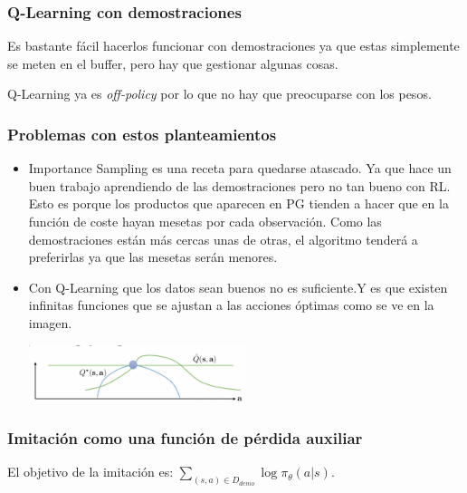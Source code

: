 \subsubsection{Q-Learning con demostraciones}%
\label{ssub:q_learning_con_demostraciones}

Es bastante fácil hacerlos funcionar con demostraciones ya que estas simplemente se meten en
el buffer, pero hay que gestionar algunas cosas.

Q-Learning ya es \textit{off-policy} por lo que no hay que preocuparse con los pesos.

\subsubsection{Problemas con estos planteamientos}%
\label{ssub:problemas_con_estos_planteamientos}

\begin{itemize}
    \item Importance Sampling es una receta para quedarse atascado. Ya que hace un buen trabajo
        aprendiendo de las demostraciones pero no tan bueno con RL. Esto es porque los productos
        que aparecen en PG tienden a hacer que en la función de coste hayan mesetas por cada
        observación. Como las demostraciones están más cercas unas de otras, el algoritmo
        tenderá a preferirlas ya que las mesetas serán menores.
    \item Con Q-Learning que los datos sean buenos no es suficiente.Y es que existen infinitas
     funciones que se ajustan a las acciones óptimas como se ve en la imagen.
\begin{center}
\includegraphics[width=0.5\textwidth]{figures/2020-07-16-000546_596x159_scrot.png}
\end{center}
\end{itemize}

\subsubsection{Imitación como una función de pérdida auxiliar}%
\label{ssub:imitación_como_una_función_de_pérdida_auxiliar}

El objetivo de la imitación es: $\sum_{(s,a)\in D_{demo}} \log\pi_\theta(a|s)$.

